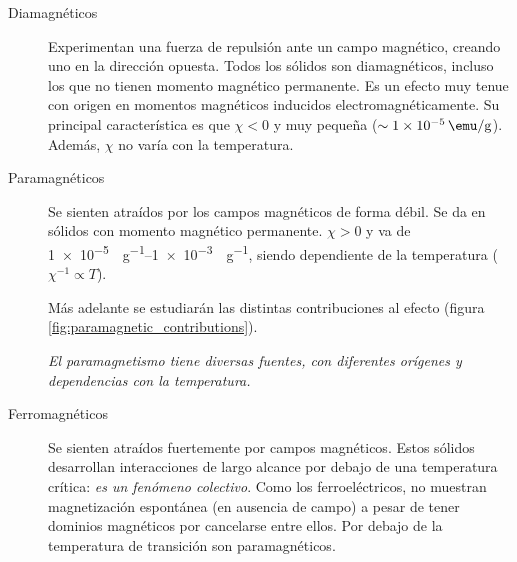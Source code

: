 \documentclass{tufte-book}
\begin{document}
\begin{description}
\item[Diamagnéticos]
  Experimentan una fuerza de repulsión ante un campo magnético, creando
  uno en la dirección opuesta.
  Todos los sólidos son diamagnéticos, incluso los que no tienen momento
  magnético permanente. Es un efecto muy tenue con origen en momentos
  magnéticos inducidos electromagnéticamente. Su principal
  característica es que $χ<0$ y muy pequeña ($\sim
  \SI{1e-5}{\emu\per\gram}$). Además, $χ$ no varía con la temperatura.

\item[Paramagnéticos]
  Se sienten atraídos por los campos magnéticos de forma débil. Se da
en sólidos con momento magnético permanente. $χ>0$ y va de
\SIrange{1e-5}{1e-3}{\emu\per\gram}, siendo dependiente de la
temperatura ($χ^{-1} ∝ T$).

  Más adelante se estudiarán las distintas contribuciones al efecto
  (figura \ref{fig:paramagnetic_contributions}).

  \begin{marginfigure}
    \centering
    \caption{\itshape El paramagnetismo tiene diversas fuentes, con diferentes
      orígenes y dependencias con la temperatura.}
    \label{fig:paramagnetic_contributions}
  \end{marginfigure}


\item[Ferromagnéticos]
  Se sienten atraídos fuertemente por campos magnéticos. Estos sólidos
  desarrollan interacciones de largo alcance por debajo de una
  temperatura crítica: \emph{es un fenómeno colectivo}. Como los
  ferroeléctricos, no muestran magnetización espontánea (en ausencia de
  campo) a pesar de tener dominios magnéticos por cancelarse entre
  ellos.
  Por debajo de la temperatura de transición son paramagnéticos.

\end{description}
\end{document}

